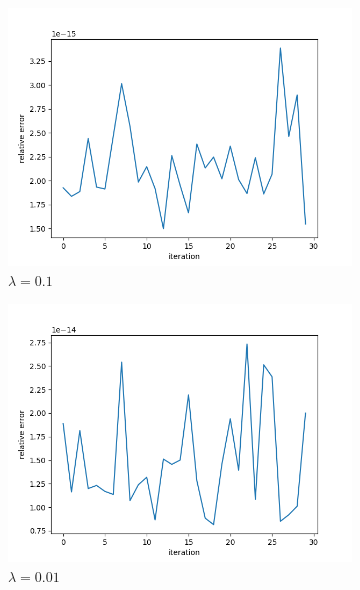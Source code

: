 \documentclass[thesis=M,english]{FITthesis}[2012/10/20]
\begin{document}
\begin{itemize}
\begin{figure}
\centering
\begin{subfigure}{.7\textwidth}
  \centering
  \includegraphics[width=1\linewidth]{img/ex3/relative01.png}
  \caption{ $\lambda = 0.1$ }
  \label{fig:sub1}
\end{subfigure}
\begin{subfigure}{.7\textwidth}
  \centering
  \includegraphics[width=1\linewidth]{img/ex3/relative001.png}
  \caption{$\lambda = 0.01$}
  \label{fig:sub1}
\end{subfigure}
\begin{subfigure}{.7\textwidth}
  \centering

\end{subfigure}
\end{figure}
\end{itemize}
\end{document}
